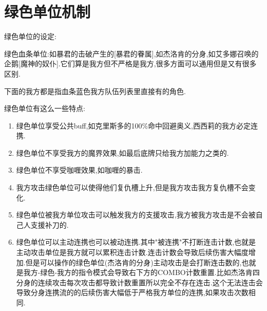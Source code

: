
\newpage

\section{绿色单位机制}

绿色单位的设定:

绿色血条单位:如暴君的击破产生的[暴君的眷属],如杰洛肯的分身,如艾多娜召唤的企鹅[魔神的奴仆].它们算是我方但不严格是我方,很多方面可以通用但是又有很多区别.

下面的我方都是指血条蓝色我方队伍列表里直接有的角色.

绿色单位有这么一些特点:

\begin{enumerate}
	\item 绿色单位享受公共buff,如克里斯多的100\%命中回避奥义,西西莉的我方必定连携.
	\item 绿色单位不享受我方的魔界效果,如最后底牌只给我方加能力之类的.
	\item 绿色单位不享受咖喱效果,如咖喱的暴击.
	\item 我方攻击绿色单位可以使得他们复仇槽上升,但是我方攻击我方复仇槽不会变化.
	\item 绿色单位被我方单位攻击可以触发我方的支援攻击,我方被我方攻击是不会被自己人支援补刀的.
	\item 绿色单位可以主动连携也可以被动连携.其中"被连携"不打断连击计数,也就是主动攻击单位是我方就可以累积连击计数.连击计数会导致后续伤害大幅度增加.但是可以操作的绿色单位(杰洛肯的分身)主动攻击是会打断连击数的,也就是我方-绿色-我方的指令模式会导致右下方的COMBO计数重置.比如杰洛肯四分身的连续攻击每次攻击都导致计数重置所以完全不存在连击.这个无法连击会导致分身连携流的的后续伤害大幅低于严格我方单位的连携,如果攻击次数相同.
\end{enumerate}